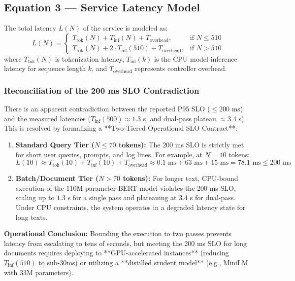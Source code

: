 \documentclass[10pt]{article}
\begin{document}
\subsection{Equation 3 --- Service Latency Model}
The total latency $L(N)$ of the service is modeled as:
\begin{equation}
L(N) = \begin{cases} T_{\text{tok}}(N) + T_{\text{inf}}(N) + T_{\text{overhead}}, & \text{if } N \le 510 \\ T_{\text{tok}}(N) + 2 \cdot T_{\text{inf}}(510) + T_{\text{overhead}}, & \text{if } N > 510 \end{cases}
\end{equation}
where $T_{\text{tok}}(N)$ is tokenization latency, $T_{\text{inf}}(k)$ is the CPU model inference latency for sequence length $k$, and $T_{\text{overhead}}$ represents controller overhead.

\subsubsection{Reconciliation of the 200 ms SLO Contradiction}
\label{subsec:slo_reconciliation}
There is an apparent contradiction between the reported P95 SLO ($\le 200$ ms) and the measured latencies ($T_{\text{inf}}(500) \approx 1.3$ s, and dual-pass plateau $\approx 3.4$ s). This is resolved by formalizing a **Two-Tiered Operational SLO Contract**:
\begin{enumerate}
\item \textbf{Standard Query Tier ($N \le 70$ tokens):} The 200 ms SLO is strictly met for short user queries, prompts, and log lines. For example, at $N = 10$ tokens:
  \begin{equation}
  L(10) \approx T_{\text{tok}}(10) + T_{\text{inf}}(10) + T_{\text{overhead}} \approx 0.1\text{ ms} + 63\text{ ms} + 15\text{ ms} = 78.1\text{ ms} \le 200\text{ ms}
  \end{equation}
\item \textbf{Batch/Document Tier ($N > 70$ tokens):} For longer text, CPU-bound execution of the 110M parameter BERT model violates the 200 ms SLO, scaling up to $1.3$ s for a single pass and plateauing at $3.4$ s for dual-pass. Under CPU constraints, the system operates in a degraded latency state for long texts. 
\end{enumerate}
\textbf{Operational Conclusion:} Bounding the execution to two passes prevents latency from escalating to tens of seconds, but meeting the 200 ms SLO for long documents requires deploying to **GPU-accelerated instances** (reducing $T_{\text{inf}}(510)$ to sub-30ms) or utilizing a **distilled student model** (e.g., MiniLM with 33M parameters).
\end{document}
